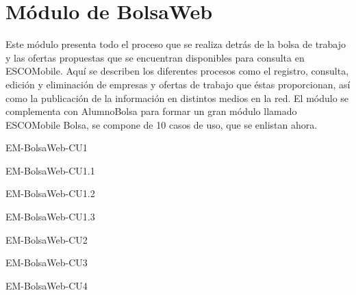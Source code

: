 \section{Módulo de BolsaWeb}

\noindent
Este módulo presenta todo el proceso que se realiza detrás de la bolsa de trabajo y las ofertas 
propuestas que se encuentran disponibles para consulta en ESCOMobile. Aquí se describen los diferentes
procesos como el registro, consulta, edición y eliminación de empresas y ofertas de trabajo que
éstas proporcionan, así como la publicación de la información en distintos medios en la red.
El módulo se complementa con AlumnoBolsa para formar un gran módulo llamado ESCOMobile Bolsa,
se compone de 10 casos de uso, que se enlistan ahora. 

\begin{requisitos}{EM-BolsaWeb-CU1}
\end{requisitos}

\begin{requisitos}{EM-BolsaWeb-CU1.1}
\end{requisitos}

\begin{requisitos}{EM-BolsaWeb-CU1.2}
\end{requisitos}

\begin{requisitos}{EM-BolsaWeb-CU1.3}
\end{requisitos}

\begin{requisitos}{EM-BolsaWeb-CU2}
\end{requisitos}

\begin{requisitos}{EM-BolsaWeb-CU3}
\end{requisitos}

\begin{requisitos}{EM-BolsaWeb-CU4}
\end{requisitos}

